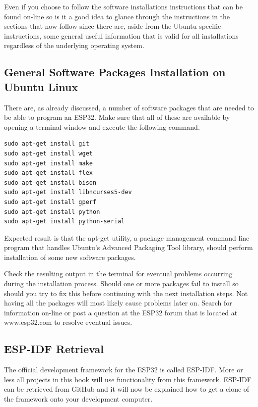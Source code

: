 \documentclass{tufte-book}
\begin{document}
Even if you choose to follow the software installations instructions that can be found on-line so is it a good idea to glance through the instructions in the sections that now follow since there are, aside from the Ubuntu specific instructions, some general useful information that is valid for all installations regardless of the underlying operating system.

\subsection{General Software Packages Installation on Ubuntu Linux}
There are, as already discussed, a number of software packages that are needed to be able to program an ESP32. Make sure that all of these are available by opening a terminal window and execute the following command.
	
\begin{lstlisting}
sudo apt-get install git
sudo apt-get install wget
sudo apt-get install make
sudo apt-get install flex
sudo apt-get install bison
sudo apt-get install libncurses5-dev
sudo apt-get install gperf
sudo apt-get install python
sudo apt-get install python-serial
\end{lstlisting}

Expected result is that the apt-get utility, a package management command line program that handles Ubuntu's Advanced Packaging Tool library, should perform installation of some new software packages.
 
Check the resulting output in the terminal for eventual problems occurring during the installation process. Should one or more packages fail to install so should you try to fix this before continuing with the next installation steps. Not having all the packages will most likely cause problems later on. Search for information on-line or post a question at the ESP32 forum that is located at www.esp32.com to resolve eventual issues.

\subsection{ESP-IDF Retrieval}


The official development framework for the ESP32 is called ESP-IDF. More or less all projects in this book will use functionality from this framework. ESP-IDF can be retrieved from GitHub and it will now be explained how to get a clone of the framework onto your development computer.
\end{document}
